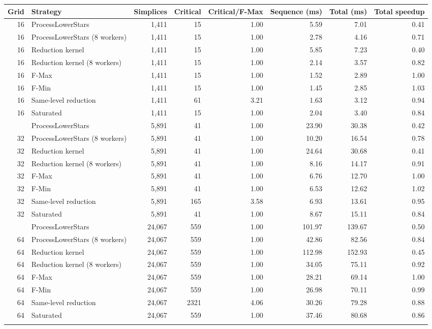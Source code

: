 \begin{tabular}{rlrrrrrr}
\toprule
Grid & Strategy & Simplices & Critical & Critical/F-Max & Sequence (ms) & Total (ms) & Total speedup \\
\midrule
16 & ProcessLowerStars & 1,411 & 15 & 1.00 & 5.59 & 7.01 & 0.41 \\
16 & ProcessLowerStars (8 workers) & 1,411 & 15 & 1.00 & 2.78 & 4.16 & 0.71 \\
16 & Reduction kernel & 1,411 & 15 & 1.00 & 5.85 & 7.23 & 0.40 \\
16 & Reduction kernel (8 workers) & 1,411 & 15 & 1.00 & 2.14 & 3.57 & 0.82 \\
16 & F-Max & 1,411 & 15 & 1.00 & 1.52 & 2.89 & 1.00 \\
16 & F-Min & 1,411 & 15 & 1.00 & 1.45 & 2.85 & 1.03 \\
16 & Same-level reduction & 1,411 & 61 & 3.21 & 1.63 & 3.12 & 0.94 \\
16 & Saturated & 1,411 & 15 & 1.00 & 2.04 & 3.40 & 0.84 \\
\addlinespace
32 & ProcessLowerStars & 5,891 & 41 & 1.00 & 23.90 & 30.38 & 0.42 \\
32 & ProcessLowerStars (8 workers) & 5,891 & 41 & 1.00 & 10.20 & 16.54 & 0.78 \\
32 & Reduction kernel & 5,891 & 41 & 1.00 & 24.64 & 30.68 & 0.41 \\
32 & Reduction kernel (8 workers) & 5,891 & 41 & 1.00 & 8.16 & 14.17 & 0.91 \\
32 & F-Max & 5,891 & 41 & 1.00 & 6.76 & 12.70 & 1.00 \\
32 & F-Min & 5,891 & 41 & 1.00 & 6.53 & 12.62 & 1.02 \\
32 & Same-level reduction & 5,891 & 165 & 3.58 & 6.93 & 13.61 & 0.95 \\
32 & Saturated & 5,891 & 41 & 1.00 & 8.67 & 15.11 & 0.84 \\
\addlinespace
64 & ProcessLowerStars & 24,067 & 559 & 1.00 & 101.97 & 139.67 & 0.50 \\
64 & ProcessLowerStars (8 workers) & 24,067 & 559 & 1.00 & 42.86 & 82.56 & 0.84 \\
64 & Reduction kernel & 24,067 & 559 & 1.00 & 112.98 & 152.93 & 0.45 \\
64 & Reduction kernel (8 workers) & 24,067 & 559 & 1.00 & 34.05 & 75.11 & 0.92 \\
64 & F-Max & 24,067 & 559 & 1.00 & 28.21 & 69.14 & 1.00 \\
64 & F-Min & 24,067 & 559 & 1.00 & 26.98 & 70.11 & 0.99 \\
64 & Same-level reduction & 24,067 & 2321 & 4.06 & 30.26 & 79.28 & 0.88 \\
64 & Saturated & 24,067 & 559 & 1.00 & 37.46 & 80.68 & 0.86 \\
\addlinespace
\bottomrule
\end{tabular}
